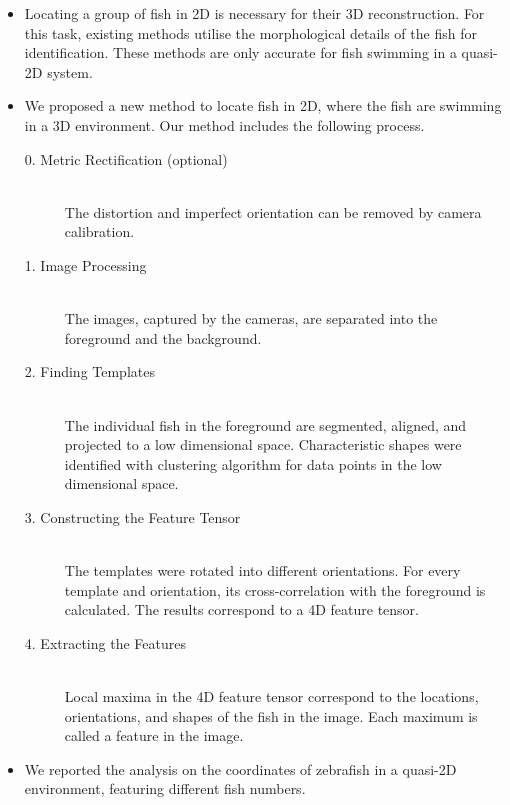 \documentclass[11pt,twoside]{report}
\begin{document}
\vfill
\pagebreak


\begin{adjustwidth}{0cm}{-5cm}
\begin{tcolorbox}[
fonttitle=\sffamily\Large,
right=0.1\linewidth,
top=5mm,
bottom=5mm,
title=Summary of Chapter~3,
]

\begin{itemize}
	\item Locating a group of fish in 2D is necessary for their 3D reconstruction. For this task, existing methods utilise the morphological details of the fish for identification. These methods are only accurate for fish swimming in a quasi-2D system.
	\item We proposed a new method to locate fish in 2D, where the fish are swimming in a 3D environment. Our method includes the following process.
	\begin{description}
		\item[0. Metric Rectification (optional)] \hfill \\ 
		The distortion and imperfect orientation can be removed by camera calibration.
		\item[1. Image Processing] \hfill \\ 
		The images, captured by the cameras, are separated into the foreground and the background.
		\item[2. Finding Templates] \hfill \\ 
		The individual fish in the foreground are segmented, aligned, and projected to a low dimensional space. Characteristic shapes were identified with clustering algorithm for data points in the low dimensional space.
		\item[3. Constructing the Feature Tensor] \hfill \\ 
		The templates were rotated into different orientations. For every template and orientation, its cross-correlation with the foreground is calculated. The results correspond to a 4D feature tensor.
		\item[4. Extracting the Features] \hfill \\ 
		Local maxima in the 4D feature tensor correspond to the locations, orientations, and shapes of the fish in the image. Each maximum is called a feature in the image.
	\end{description}
	\item We reported the analysis on the coordinates of zebrafish in a quasi-2D environment, featuring different fish numbers.
	\begin{description}

\end{description}
\end{itemize}
\end{tcolorbox}
\end{adjustwidth}
\end{document}
